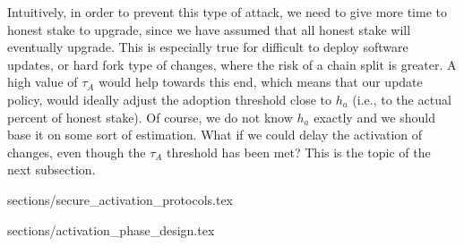 {Intuitively, in order to prevent this type of attack, we need to give more time to honest stake to upgrade, since we have assumed that all honest stake will eventually upgrade. This is especially true for difficult to deploy software updates, or hard fork type of changes, where the risk of a chain split is greater. A high value of $\tau_A$ would help towards this end, which means that our update policy, would ideally adjust the adoption threshold close to $h_a$ (i.e., to the actual percent of honest stake). Of course, we do not know $h_a$ exactly and we should base it on some sort of estimation. What if we could delay the activation of changes, even though the $\tau_A$ threshold has been met? This is the topic of the next subsection. 
}



{sections/secure_activation_protocols.tex}

{sections/activation_phase_design.tex}
